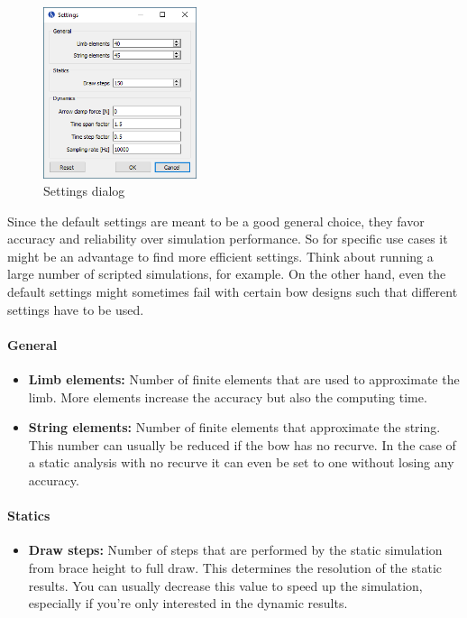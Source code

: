 \documentclass[12pt]{article}
\begin{document}
\begin{figure}[H]
\centering
\includegraphics[width=0.4\textwidth]{figures/screenshots/input/settings}
\caption{Settings dialog}
\label{fig:settings}
\end{figure}

\newpage

Since the default settings are meant to be a good general choice, they favor accuracy and reliability over simulation performance.
So for specific use cases it might be an advantage to find more efficient settings.
Think about running a large number of scripted simulations, for example.
On the other hand, even the default settings might sometimes fail with certain bow designs such that different settings have to be used.

\paragraph*{General}

\begin{itemize}
\item \textbf{Limb elements:} Number of finite elements that are used to approximate the limb. More elements increase the accuracy but also the computing time.
\item \textbf{String elements:} Number of finite elements that approximate the string. This number can usually be reduced if the bow has no recurve. In the case of a static analysis with no recurve it can even be set to one without losing any accuracy.
\end{itemize}

\paragraph*{Statics}

\begin{itemize}
\item \textbf{Draw steps:} Number of steps that are performed by the static simulation from brace height to full draw. This determines the resolution of the static results. You can usually decrease this value to speed up the simulation, especially if you're only interested in the dynamic results.
\end{itemize}
\end{document}

